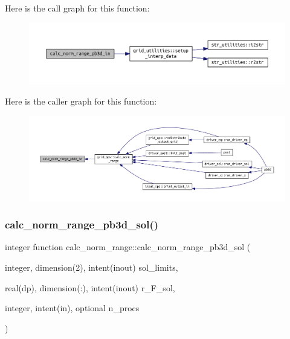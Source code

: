 Here is the call graph for this function\+:
\nopagebreak
\begin{figure}[H]
\begin{center}
\leavevmode
\includegraphics[width=350pt]{grid__ops_8f90_aebe21d718069318bced62bc3d2d09393_cgraph}
\end{center}
\end{figure}
Here is the caller graph for this function\+:
\nopagebreak
\begin{figure}[H]
\begin{center}
\leavevmode
\includegraphics[width=350pt]{grid__ops_8f90_aebe21d718069318bced62bc3d2d09393_icgraph}
\end{center}
\end{figure}
\mbox{\label{grid__ops_8f90_a9121423739548f1a1fa4e87055f49010}} 
\subsubsection{\texorpdfstring{calc\+\_\+norm\+\_\+range\+\_\+pb3d\+\_\+sol()}{calc\_norm\_range\_pb3d\_sol()}}
{\footnotesize\ttfamily integer function calc\+\_\+norm\+\_\+range\+::calc\+\_\+norm\+\_\+range\+\_\+pb3d\+\_\+sol (\begin{DoxyParamCaption}\item[{integer, dimension(2), intent(inout)}]{sol\+\_\+limits,  }\item[{real(dp), dimension(\+:), intent(inout)}]{r\+\_\+\+F\+\_\+sol,  }\item[{integer, intent(in), optional}]{n\+\_\+procs }\end{DoxyParamCaption})}



